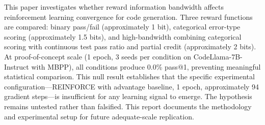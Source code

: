 
This paper investigates whether reward information bandwidth affects reinforcement learning convergence for code generation. Three reward functions are compared: binary pass/fail (approximately 1 bit), categorical error-type scoring (approximately 1.5 bits), and high-bandwidth combining categorical scoring with continuous test pass ratio and partial credit (approximately 2 bits). At proof-of-concept scale (1 epoch, 3 seeds per condition on CodeLlama-7B-Instruct with MBPP), all conditions produce 0.0\% pass@1, preventing meaningful statistical comparison. This null result establishes that the specific experimental configuration---REINFORCE with advantage baseline, 1 epoch, approximately 94 gradient steps---is insufficient for any learning signal to emerge. The hypothesis remains untested rather than falsified. This report documents the methodology and experimental setup for future adequate-scale replication.
